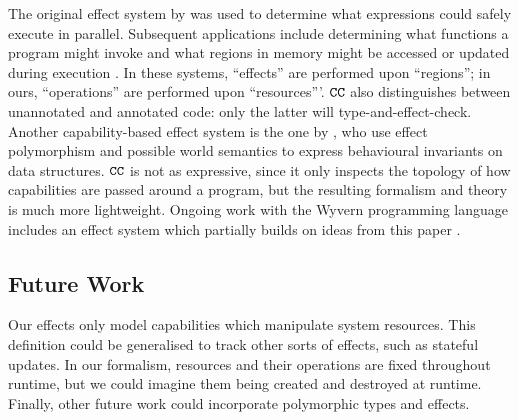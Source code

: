 The original effect system by \cite{lucassen88} was used to determine what expressions could safely execute in parallel. Subsequent applications include determining what functions a program might invoke \cite{tang94} and what regions in memory might be accessed or updated during execution \cite{talpin94}. In these systems, ``effects'' are performed upon ``regions''; in ours, ``operations'' are performed upon ``resources'''. $\mathtt{CC}$ also distinguishes between unannotated and annotated code: only the latter will type-and-effect-check. Another capability-based effect system is the one by \cite{devriese16}, who use effect polymorphism and possible world semantics to express behavioural invariants on data structures. $\mathtt{CC}$ is not as expressive, since it only inspects the topology of
how capabilities are passed around a program, but the resulting formalism and theory is much more
lightweight. Ongoing work with the Wyvern programming language includes an
effect system which partially builds on ideas from this paper \cite{melicher18}.

\subsection{Future Work}

Our effects only model capabilities which manipulate system resources. This
definition could be generalised to track other sorts of effects, such as stateful
updates. In our formalism, resources and their operations are fixed throughout
runtime, but we could imagine them being created and destroyed at runtime. 
Finally, other future work could incorporate polymorphic types and effects.
